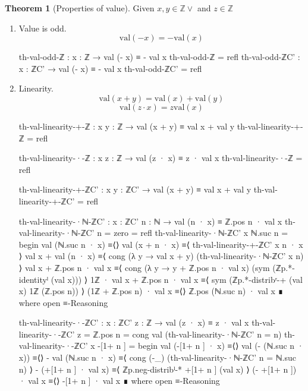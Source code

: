 \documentclass[a4paper]{report}
\theoremstyle{definition}
\theoremstyle{lemma}
\theoremstyle{theorem}
\newtheorem{theorem}{Theorem}
\newcommand\bZ{\mathbb{Z}}
\begin{document}
\begin{theorem}[Properties of value]
Given $x,y\in\bZ \lor $ and $z\in\bZ$
\begin{enumerate}
  \item Value is odd.
    \[\mathrm{val}(-x) = -\mathrm{val}(x)\]
    \begin{code}
th-val-odd-ℤ : {x : ℤ} → val (- x) ≡ - val x
th-val-odd-ℤ = refl
th-val-odd-ℤC' : {x : ℤC'} → val (- x) ≡ - val x
th-val-odd-ℤC' = refl
\end{code}
  \item Linearity.
    \[\mathrm{val}(x+y) = \mathrm{val}(x)+\mathrm{val}(y)\]
    \[\mathrm{val}(z\cdot x) = z\mathrm{val}(x)\]
    \begin{code}
th-val-linearity-+-ℤ : {x y : ℤ} → val (x + y) ≡ val x + val y
th-val-linearity-+-ℤ = refl

th-val-linearity-·-ℤ : {x z : ℤ} → val (z · x) ≡ z · val x
th-val-linearity-·-ℤ = refl


th-val-linearity-+-ℤC' : {x y : ℤC'} → val (x + y) ≡ val x + val y
th-val-linearity-+-ℤC' = refl

th-val-linearity-·ℕ-ℤC' : {x : ℤC'} {n : ℕ} → val (n · x) ≡ ℤ.pos n · val x
th-val-linearity-·ℕ-ℤC' {n = zero}    = refl
th-val-linearity-·ℕ-ℤC' {x} {ℕ.suc n} = begin
  val (ℕ.suc n · x)            ≡⟨⟩
  val (x + n · x)              ≡⟨ th-val-linearity-+-ℤC' {x} {n · x} ⟩
  val x + val (n · x)          ≡⟨ cong (λ y → val x + y)
                                  (th-val-linearity-·ℕ-ℤC' {x} {n}) ⟩
  val x + ℤ.pos n · val x      ≡⟨ cong (λ y → y + ℤ.pos n · val x)
                                       (sym (ℤp.*-identityˡ (val  x))) ⟩
  1ℤ · val x + ℤ.pos n · val x ≡⟨ sym (ℤp.*-distribʳ-+ (val x) 1ℤ (ℤ.pos n)) ⟩
  (1ℤ + ℤ.pos n) · val x       ≡⟨⟩
  ℤ.pos (ℕ.suc n) · val x      ∎
  where open ≡-Reasoning

th-val-linearity-·-ℤC' : {x : ℤC'} {z : ℤ} → val (z · x) ≡ z · val x
th-val-linearity-·-ℤC' {z = ℤ.pos n}  = cong val (th-val-linearity-·ℕ-ℤC' {n = n})
th-val-linearity-·-ℤC' {x} { -[1+ n ]} = begin
  val (-[1+ n ] · x)        ≡⟨⟩
  val (- (ℕ.suc n · x))     ≡⟨⟩
  - val (ℕ.suc n · x)       ≡⟨ cong (-_) (th-val-linearity-·ℕ-ℤC' {n = ℕ.suc n}) ⟩
  - (+[1+ n ] · val x)      ≡⟨ ℤp.neg-distribˡ-* +[1+ n ] (val x) ⟩
  (- +[1+ n ]) · val x      ≡⟨⟩
  -[1+ n ] · val x          ∎
  where open ≡-Reasoning
  \end{code}
\end{enumerate}
\end{theorem}
\end{document}
